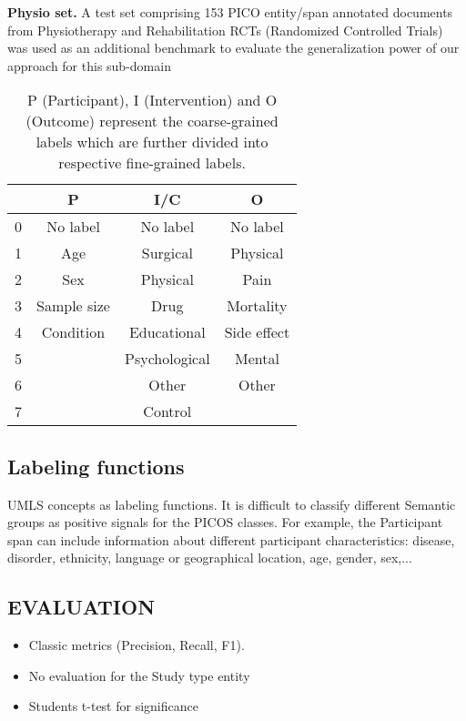 \documentclass[10.7pt,]{article}
\begin{document}
\textbf{Physio set.} A test set comprising 153 PICO entity/span annotated documents from Physiotherapy and Rehabilitation RCTs (Randomized Controlled Trials) was used as an additional benchmark to evaluate the generalization power of our approach for this sub-domain


\begin{table}[h!]
\begin{center}
\begin{tabular}{| c | c | c | c |} 
\hline
 & P & I/C & O \\ 
\hline
0 & No label & No label & No label \\ 
1 & Age & Surgical & Physical \\ 
2 & Sex & Physical & Pain \\
3 & Sample size & Drug & Mortality \\
4 & Condition & Educational & Side effect \\
5 &  & Psychological & Mental \\
6 &  & Other & Other \\
7 &  & Control &  \\
\hline
\end{tabular}
\caption{P (Participant), I (Intervention) and O (Outcome) represent the coarse-grained labels which are further divided into respective fine-grained labels.}
\label{table:coarsefineconcept}
\end{center}
\end{table}


%
%
%
\subsection{Labeling functions}\label{data}
%
UMLS concepts as labeling functions. It is difficult to classify different Semantic groups as positive signals for the PICOS classes. For example, the Participant span can include information about different participant characteristics: disease, disorder, ethnicity, language or geographical location, age, gender, sex,... 
%
%
%
\subsection{EVALUATION}\label{eval}
%
\begin{itemize}
    \item Classic metrics (Precision, Recall, F1).
    \item No evaluation for the Study type entity
    \item Students t-test for significance
\end{itemize}
%
%
%
\end{document}
